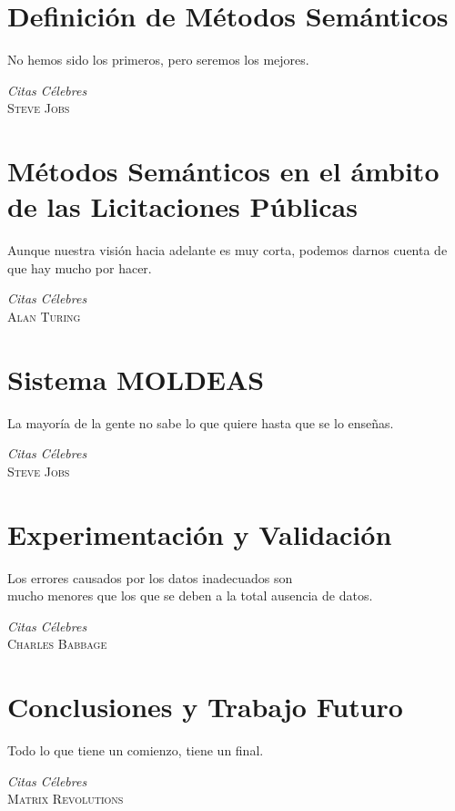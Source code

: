 \documentclass[a4paper,final,11pt,fleqn,twoside]{book}  %
\begin{document}
\chapter{\label{capitulo:metodos}Definición de Métodos Semánticos} %
\epigraph{No hemos sido los primeros, pero seremos los mejores.}
{\textit{Citas Célebres}\\ \textsc{Steve Jobs}}

\chapter{\label{capitulo:metodos-separados}Métodos Semánticos en el ámbito de las Licitaciones Públicas} %
\epigraph{Aunque nuestra visión hacia adelante es muy corta, podemos darnos cuenta de que hay mucho por hacer.}
{\textit{Citas Célebres}\\ \textsc{Alan Turing}}

\chapter{\label{capitulo:moldeas}Sistema MOLDEAS} %
\epigraph{La mayoría de la gente no sabe lo que quiere hasta que se lo enseñas.}
{\textit{Citas Célebres}\\ \textsc{Steve Jobs}}

\chapter{\label{capitulo:validacion}Experimentación y Validación} %
\epigraph{Los errores causados por los datos inadecuados son \\ mucho menores que los que se deben a la total ausencia de datos.}
{\textit{Citas Célebres}\\ \textsc{Charles Babbage}}

%
\chapter{\label{capitulo:conclusiones}Conclusiones y Trabajo Futuro} %
\epigraph{Todo lo que tiene un comienzo, tiene un final.}
{\textit{Citas Célebres}\\ \textsc{Matrix Revolutions}}

\appendix
\end{document}

